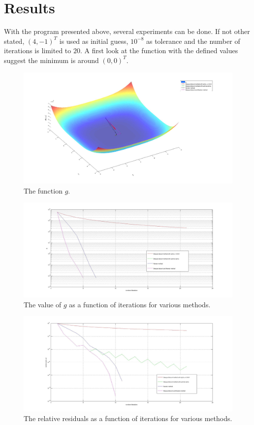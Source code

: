 \documentclass[a4paper,12pt]{article}
\begin{document}
\section{Results}
With the program presented above, several experiments can be done.
If not other stated, $(4,-1)^T$ is used as initial guess, $10^{-8}$ as tolerance and the number of iterations is limited to $20$.
A first look at the function with the defined values suggest the minimum is around $(0,0)^T$.
\begin{figure}\label{g}
	\includegraphics[width=\textwidth]{g.jpg}
	\caption{The function $g$.}
\end{figure}
\begin{figure}\label{gvalue}
	\includegraphics[width=\textwidth]{gvalues.jpg}
	\caption{The value of $g$ as a function of iterations for various methods.}
\end{figure}
\begin{figure}\label{res}
	\includegraphics[width=\textwidth]{res.jpg}
	\caption{The relative residuals as a function of iterations for various methods.}
\end{figure}
\end{document}
